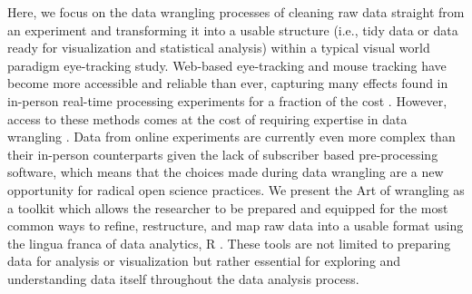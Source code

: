 Here, we focus on the data wrangling processes of cleaning raw data straight from an experiment and transforming it into a usable structure (i.e., tidy data or data ready for visualization and statistical analysis) within a typical visual world paradigm eye-tracking study.  Web-based eye-tracking and mouse tracking have become more accessible and reliable than ever, capturing many effects found in in-person real-time processing experiments for a fraction of the cost \parencite[e.g.,][]{Vos_2017,Semmelmann_2017,Prystauka_Altmann_Rothman_2023,Degen_Seeing_2021}. However, access to these methods comes at the cost of requiring expertise in data wrangling \parencite[e.g., ][]{Vos_2017,Prystauka_Altmann_Rothman_2023}. Data from online experiments are currently even more complex than their in-person counterparts given the lack of subscriber based pre-processing software, which means that the choices made during data wrangling are a new opportunity for radical open science practices. We present the Art of wrangling as a toolkit which allows the researcher to be prepared and equipped for the most common ways to refine, restructure, and map raw data into a usable format using the lingua franca of data analytics, R \parencite{mizumoto_r_2015}. These tools are not limited to preparing data for analysis or visualization but rather essential for exploring and understanding data itself throughout the data analysis process. 
